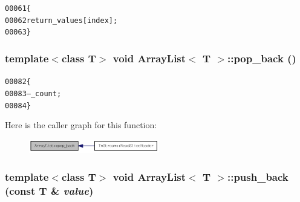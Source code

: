 \begin{footnotesize}\begin{alltt}
00061         \{
00062                 \textcolor{keywordflow}{return} \_values[index];
00063         \}
\end{alltt}\end{footnotesize}


\hypertarget{class_array_list_ad98cc674ef8dcc42f53b4836416a289c}{
\subsubsection[{pop\_\-back}]{\setlength{\rightskip}{0pt plus 5cm}template$<$class T$>$ void {\bf ArrayList}$<$ T $>$::pop\_\-back ()}}
\label{class_array_list_ad98cc674ef8dcc42f53b4836416a289c}




\begin{footnotesize}\begin{alltt}
00082         \{
00083                 --\_count;
00084         \}
\end{alltt}\end{footnotesize}




Here is the caller graph for this function:\nopagebreak
\begin{figure}[H]
\begin{center}
\leavevmode
\includegraphics[width=161pt]{class_array_list_ad98cc674ef8dcc42f53b4836416a289c_icgraph}
\end{center}
\end{figure}


\hypertarget{class_array_list_a7b5376678a9b5af0e0ed913fbe04b902}{
\subsubsection[{push\_\-back}]{\setlength{\rightskip}{0pt plus 5cm}template$<$class T$>$ void {\bf ArrayList}$<$ T $>$::push\_\-back (const T \& {\em value})}}
\label{class_array_list_a7b5376678a9b5af0e0ed913fbe04b902}




